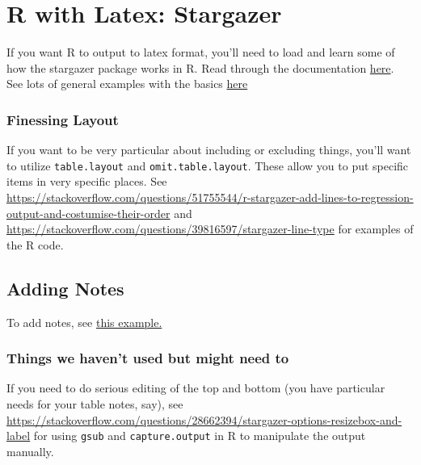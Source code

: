\section{R with Latex: Stargazer}
If you want R to output to latex format, you'll need to load and learn some of how the stargazer package works in R. Read through the documentation \href{https://www.rdocumentation.org/packages/stargazer/versions/5.2.2/topics/stargazer}{here}. See lots of general examples with the basics \href{https://www.jakeruss.com/cheatsheets/stargazer/#change-which-statistics-are-displayed}{here}

\subsubsection{Finessing Layout}
If you want to be very particular about including or excluding things, you'll want to utilize \verb+table.layout+ and \verb+omit.table.layout+. These allow you to put specific items in very specific places. See \url{https://stackoverflow.com/questions/51755544/r-stargazer-add-lines-to-regression-output-and-costumise-their-order} and \url{https://stackoverflow.com/questions/39816597/stargazer-line-type} for examples of the R code.

\subsection{Adding Notes}
To add notes, see \href{https://stackoverflow.com/questions/26950517/add-a-row-with-notes-using-stargazer}{this example.}

\subsubsection{Things we haven't used but might need to}
If you need to do serious editing of the top and bottom (you have particular needs for your table notes, say), see \url{https://stackoverflow.com/questions/28662394/stargazer-options-resizebox-and-label} for using \verb+gsub+ and \verb+capture.output+ in R to manipulate the output manually.